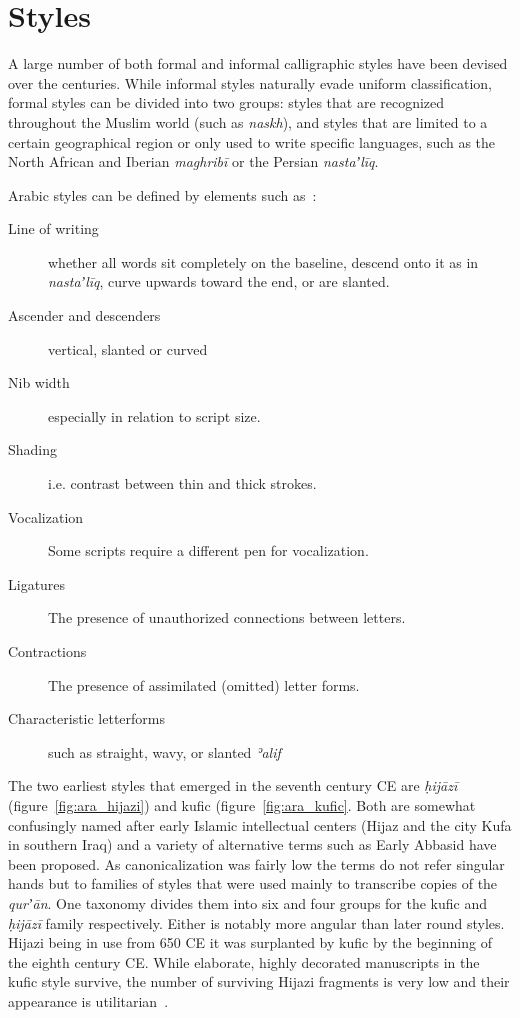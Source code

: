 \section{Styles}

A large number of both formal and informal calligraphic styles have been
devised over the centuries. While informal styles naturally evade uniform
classification, formal styles can be divided into two groups: styles that are
recognized throughout the Muslim world (such as \emph{naskh}), and styles that
are limited to a certain geographical region or only used to write specific
languages, such as the North African and Iberian \emph{maghribī} or the Persian
\emph{nastaʼlīq}. 

Arabic styles can be defined by elements such as~\cite[pg.
242-243]{gacek2009arabic}:

\begin{description}
	\item[Line of writing] whether all words sit completely on the
			       baseline, descend onto it as in
			       \emph{nastaʼlīq}, curve upwards toward the end,
			       or are slanted.
	\item[Ascender and descenders] vertical, slanted or curved
	\item[Nib width] especially in relation to script size.
	\item[Shading] i.e. contrast between thin and thick strokes.
	\item[Vocalization] Some scripts require a different pen for vocalization.
	\item[Ligatures] The presence of unauthorized connections between letters.
	\item[Contractions] The presence of assimilated (omitted) letter forms.
	\item[Characteristic letterforms] such as straight, wavy, or slanted \emph{ʾalif}
\end{description}

The two earliest styles that emerged in the seventh century CE are
\emph{ḥijāzī} (figure~\ref{fig:ara_hijazi}) and kufic
(figure~\ref{fig:ara_kufic}. Both are somewhat confusingly named after early
Islamic intellectual centers (Hijaz and the city Kufa in southern Iraq) and a
variety of alternative terms such as Early Abbasid have been proposed. As
canonicalization was fairly low the terms do not refer singular hands but to
families of styles that were used mainly to transcribe copies of the
\emph{qurʼān}. One taxonomy divides them into six and four groups for the kufic
and \emph{ḥijāzī} family respectively. Either is notably more angular than
later round styles.  Hijazi being in use from 650 CE it was surplanted by kufic
by the beginning of the eighth century CE. While elaborate, highly decorated
manuscripts in the kufic style survive, the number of surviving Hijazi
fragments is very low and their appearance is utilitarian~\cite[pg. 98,
124]{gacek2009arabic}.

